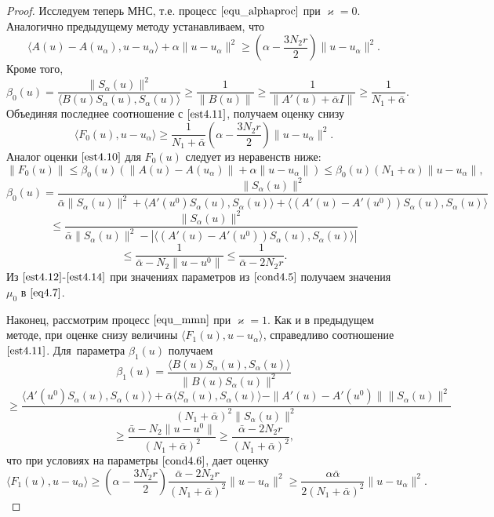 \begin{proof}
Исследуем теперь МНС, т.е. процесс $\eqref{equ_alphaproc}$ при $\varkappa=0$. Аналогично предыдущему методу устанавливаем, что
\begin{equation}\label{est4.11}
\langle A(u)-A(u_\alpha), u-u_\alpha\rangle+\alpha\|u-u_\alpha\|^2\ge\left(\alpha-\frac{3N_2 r}{2}\right)\|u-u_\alpha\|^2.
\end{equation}
Кроме того,
$$\beta_0(u)=\frac{\|S_\alpha(u)\|^2}{\langle B(u)S_\alpha(u), S_\alpha(u)\rangle}\ge\frac{1}{\|B(u)\|}\ge\frac{1}{\|A'(u)+\bar\alpha I\|}\ge\frac{1}{N_1+\bar\alpha}.$$
Объединяя последнее соотношение с $\eqref{est4.11}$, получаем оценку снизу
\begin{equation}\label{est4.12}
\langle F_0(u), u-u_\alpha\rangle\ge\frac{1}{N_1+\bar\alpha}\left (\alpha -\frac{3N_2 r}{2}\right )\|u-u_\alpha\|^2.
\end{equation}
Аналог оценки $\eqref{est4.10}$ для $F_0(u)$ следует из неравенств ниже:
\begin{equation}\label{est4.13}
\|F_0(u)\|\le\beta_0(u)(\|A(u)-A(u_\alpha)\|+\alpha\|u-u_\alpha\|)\le\beta_0(u)(N_1+\alpha)\|u-u_\alpha\|,
\end{equation}
$$\beta_0(u)=\frac{\|S_\alpha(u)\|^2}{\bar\alpha\|S_\alpha(u)\|^2+\langle A'(u^0)S_\alpha(u), S_\alpha(u)\rangle+\langle (A'(u)-A'(u^0))S_\alpha(u), S_\alpha(u)\rangle}$$
$$\le \frac{\|S_\alpha(u)\|^2}{\bar\alpha\|S_\alpha(u)\|^2-|\langle (A'(u)-A'(u^0))S_\alpha(u), S_\alpha(u)\rangle|}$$
\begin{equation}\label{est4.14}
\le\frac{1}{\bar\alpha -N_2\|u-u^0\|}\le\frac{1}{\bar\alpha -2N_2 r}.
\end{equation}
Из $\eqref{est4.12}$-$\eqref{est4.14}$ при значениях параметров из $\eqref{cond4.5}$ получаем значения $\mu_0$ в $\eqref{eq4.7}$.

Наконец, рассмотрим процесс $\eqref{equ_mmn}$ при $\varkappa=1$. Как и в предыдущем методе, при оценке снизу величины $\langle F_1(u), u-u_\alpha\rangle$, справедливо соотношение $\eqref{est4.11}$. Для~параметра $\beta_1(u)$ получаем
$$\beta_1(u)=\frac{\langle B(u)S_\alpha(u), S_\alpha(u)\rangle}{\|B(u)S_\alpha(u)\|^2}$$$$\ge\frac{\langle A'(u^0)S_\alpha(u), S_\alpha(u)\rangle+\bar\alpha\langle S_\alpha(u), S_\alpha(u)\rangle-\|A'(u)-A'(u^0)\|\|S_\alpha(u)\|^2}{(N_1+\bar\alpha)^2\|S_\alpha(u)\|^2}$$$$\ge\frac{\bar\alpha -N_2\|u-u^0\|}{(N_1+\bar\alpha)^2}\ge\frac{\bar\alpha -2N_2 r}{(N_1+\bar\alpha)^2},$$
что при условиях на параметры $\eqref{cond4.6}$, дает оценку
\begin{equation}\label{est4.15}
\langle F_1(u), u-u_\alpha\rangle\ge\left (\alpha -\frac{3N_2 r}{2}\right )\frac{\bar\alpha - 2N_2 r}{(N_1+\bar\alpha)^2}\|u-u_\alpha\|^2\ge\frac{\alpha\bar\alpha}{2(N_1+\bar\alpha)^2}\|u-u_\alpha\|^2.
\end{equation}


\end{proof}
